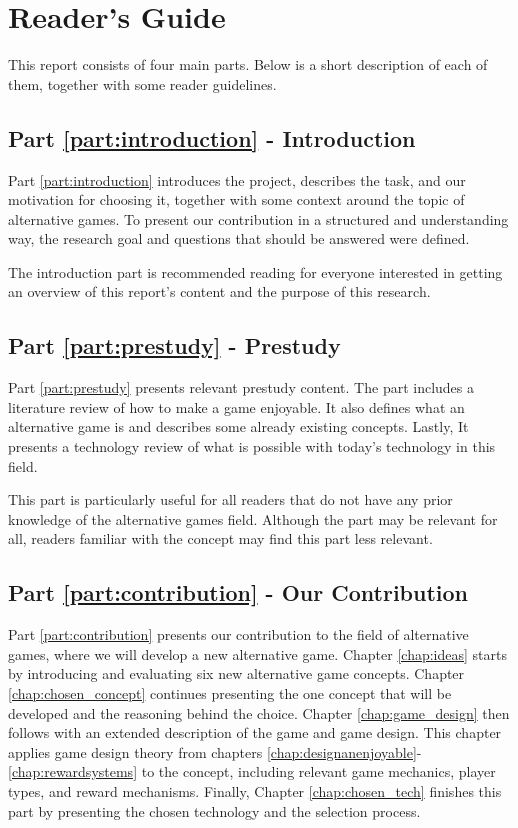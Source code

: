 \documentclass[../Main.tex]{subfiles}
\begin{document}
\section{Reader's Guide}
This report consists of four main parts. Below is a short description of each of them, together with some reader guidelines. 

\subsection*{Part \ref{part:introduction} - Introduction}
Part \ref{part:introduction} introduces the project, describes the task, and our motivation for choosing it, together with some context around the topic of alternative games. To present our contribution in a structured and understanding way, the research goal and questions that should be answered were defined.

The introduction part is recommended reading for everyone interested in getting an overview of this report’s content and the purpose of this research.

\subsection*{Part \ref{part:prestudy} - Prestudy}
Part \ref{part:prestudy} presents relevant prestudy content. The part includes a literature review of how to make a game enjoyable. It also defines what an alternative game is and describes some already existing concepts. Lastly, It presents a technology review of what is possible with today’s technology in this field. 

This part is particularly useful for all readers that do not have any prior knowledge of the alternative games field. Although the part may be relevant for all, readers familiar with the concept may find this part less relevant.


\subsection*{Part \ref{part:contribution} - Our Contribution}
Part \ref{part:contribution} presents our contribution to the field of alternative games, where we will develop a new alternative game. Chapter \ref{chap:ideas} starts by introducing and evaluating six new alternative game concepts. Chapter \ref{chap:chosen_concept} continues presenting the one concept that will be developed and the reasoning behind the choice. Chapter \ref{chap:game_design} then follows with an extended description of the game and game design. This chapter applies game design theory from chapters \ref{chap:designanenjoyable}-\ref{chap:rewardsystems} to the concept, including relevant game mechanics, player types, and reward mechanisms. Finally, Chapter \ref{chap:chosen_tech} finishes this part by presenting the chosen technology and the selection process.
\end{document}
